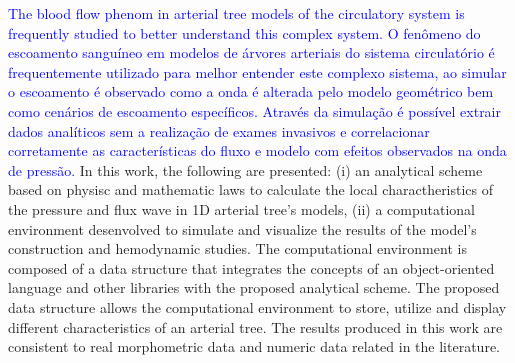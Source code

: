 \documentclass[dsc,divps,pdftex]{mmc}
\newcommand{\igunew}[1]{\textcolor{blue}{#1}}
\begin{document}
\begin{foreignabstract}
	\igunew{The blood flow phenom in arterial tree models of the circulatory system is frequently studied to better understand this complex system. O fenômeno do escoamento sanguíneo em modelos de árvores arteriais do sistema circulatório é frequentemente utilizado para melhor entender este complexo sistema, ao simular o escoamento é observado como a onda é alterada pelo modelo geométrico bem como cenários de escoamento específicos. Através da simulação é possível extrair dados analíticos sem a realização de exames invasivos e correlacionar corretamente as características do fluxo e modelo com efeitos observados na onda de pressão.}
	In this work, the following are presented: (i) an analytical scheme based on physisc and mathematic laws to calculate the local charactheristics of the pressure and flux wave in 1D arterial tree's models, (ii) a computational environment desenvolved to simulate and visualize the results of the model's construction and hemodynamic studies. 
	The computational environment is composed of a data structure that integrates the concepts of an object-oriented language and other libraries with the proposed analytical scheme.
	The proposed data structure allows the computational environment to store, utilize and display different characteristics of an arterial tree. 
	The results produced in this work are consistent to real morphometric data and numeric data related in the literature.
\end{foreignabstract}





\listoffigures  %
\listoftables


\tableofcontents




\mainmatter


%
%
%
 

\end{document}
